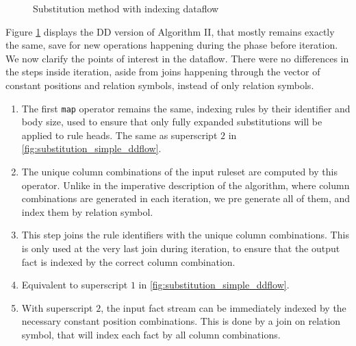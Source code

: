 \documentclass[sigconf,screen,review,natbib]{acmart}
\theoremstyle{definition}
\begin{document}
\begin{figure}
	\caption{Substitution method with indexing dataflow}
	\label{fig:substitution_indexed_ddflow}
\end{figure}
Figure \ref{fig:substitution_indexed_ddflow} displays the DD version of Algorithm II, that mostly remains exactly the same, save for
new operations happening during the phase before iteration. We now clarify the points of interest in the dataflow. There were no differences in the steps inside
iteration, aside from joins happening through the vector of constant positions and relation symbols,
instead of only relation symbols.
\begin{enumerate}
	\item The first \verb|map| operator remains the same, indexing rules by their identifier and body size, used to ensure
	      that only fully expanded substitutions will be applied to rule heads. The same as superscript $2$ in \ref{fig:substitution_simple_ddflow}.
	\item The unique column combinations of the input ruleset are computed by this operator. Unlike in the imperative description of the algorithm, where
	      column combinations are generated in each iteration, we pre generate all of them, and index them by relation symbol.
	\item This step joins the rule identifiers with the unique column combinations. This is only used at the very last join during iteration, to ensure that
	      the output fact is indexed by the correct column combination.
	\item Equivalent to superscript $1$ in \ref{fig:substitution_simple_ddflow}.
	\item With superscript $2$, the input fact stream can be immediately indexed by the necessary constant position combinations. This is done by a join on
	      relation symbol, that will index each fact by all column combinations.
\end{enumerate}
\end{document}

